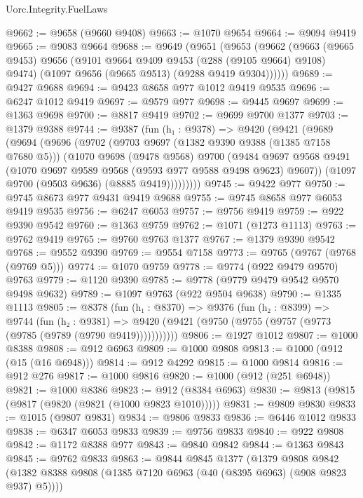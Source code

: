 \begin{lexlean}{Uorc.Integrity.FuelLaws}
\begin{coremodule}
@9662 := @9658 (@9660 @9408)
@9663 := @1070 @9654
@9664 := @9094 @9419
@9665 := @9083 @9664
@9688 := @9649
    (@9651
      (@9653
        (@9662
          (@9663
            (@9665 @9453)
            @9656
            (@9101 @9664 @9409 @9453 (@288 (@9105 @9664) @9108) @9474)
            (@1097 @9656 (@9665 @9513) (@9288 @9419 @9304))))))
@9689 := @9427 @9688
@9694 := @9423 @8658 @977 @1012 @9419 @9535
@9696 := @6247 @1012 @9419
@9697 := @9579 @977
@9698 := @9445 @9697
@9699 := @1363 @9698
@9700 := @8817 @9419
@9702 := @9699 @9700 @1377
@9703 := @1379 @9388
@9744 := @9387
    (fun (h₁ : @9378) =>
    @9420
      (@9421
        (@9689
          (@9694
            (@9696
              (@9702
                (@9703 @9697 (@1382 @9390 @9388 (@1385 @7158 @7680 @5)))
                (@1070
                  @9698
                  (@9478 @9568)
                  @9700
                  (@9484
                    @9697
                    @9568
                    @9491
                    (@1070 @9697 @9589 @9568 (@9593 @977 @9588 @9498 @9623) @9607))
                  (@1097 @9700 (@9503 @9636) (@8885 @9419)))))))))
@9745 := @9422 @977
@9750 := @9745 @8673 @977 @9431 @9419 @9688
@9755 := @9745 @8658 @977 @6053 @9419 @9535
@9756 := @6247 @6053
@9757 := @9756 @9419
@9759 := @922 @9390 @9542
@9760 := @1363 @9759
@9762 := @1071 (@1273 @1113)
@9763 := @9762 @9419
@9765 := @9760 @9763 @1377
@9767 := @1379 @9390 @9542
@9768 := @9552 @9390
@9769 := @9554 @7158
@9773 := @9765 (@9767 (@9768 (@9769 @5)))
@9774 := @1070 @9759
@9778 := @9774 (@922 @9479 @9570) @9763
@9779 := @1120 @9390
@9785 := @9778 (@9779 @9479 @9542 @9570 @9498 @9632)
@9789 := @1097 @9763 (@922 @9504 @9638)
@9790 := @1335 @1113
@9805 := @8378
    (fun (h₁ : @8370) =>
    @9376
      (fun (h₂ : @8399) =>
      @9744
        (fun (h₂ : @9381) =>
        @9420 (@9421 (@9750 (@9755 (@9757 (@9773 (@9785 (@9789 (@9790 @9419)))))))))))
@9806 := @1927 @1012
@9807 := @1000 @8388
@9808 := @912 @6963
@9809 := @1000 @9808
@9813 := @1000 (@912 (@15 (@16 @6948)))
@9814 := @912 @4292
@9815 := @1000 @9814
@9816 := @912 @276
@9817 := @1000 @9816
@9820 := @1000 (@912 (@251 @6948))
@9821 := @1000 @8386
@9823 := @912 (@8384 @6963)
@9830 := @9813 (@9815 (@9817 (@9820 (@9821 (@1000 @9823 @1010)))))
@9831 := @9809 @9830
@9833 := @1015 (@9807 @9831)
@9834 := @9806 @9833
@9836 := @6446 @1012 @9833
@9838 := @6347 @6053 @9833
@9839 := @9756 @9833
@9840 := @922 @9808
@9842 := @1172 @8388 @977
@9843 := @9840 @9842
@9844 := @1363 @9843
@9845 := @9762 @9833
@9863 := @9844
    @9845
    @1377
    (@1379
      @9808
      @9842
      (@1382 @8388 @9808 (@1385 @7120 @6963 (@40 (@8395 @6963) (@908 @9823 @937) @5))))

\end{coremodule}
\end{lexlean}
